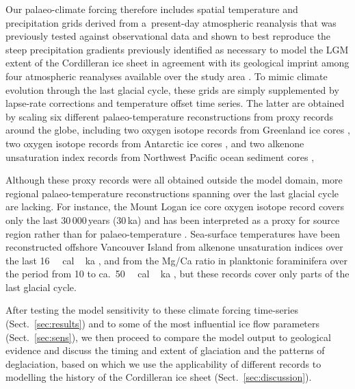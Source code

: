 \documentclass[tc, manuscript]{copernicus}
\begin{document}
      Our palaeo-climate forcing therefore includes spatial temperature and
      precipitation grids derived from a~present-day atmospheric reanalysis
      \citep{Mesinger.etal.2006} that was previously tested against
      observational data and shown to best reproduce the steep precipitation
      gradients previously identified as necessary to model the LGM extent
      of the Cordilleran ice sheet in agreement with its geological imprint
      among four atmospheric reanalyses available over the study area
      \citep{Seguinot.etal.2014}. To mimic climate evolution through the
      last glacial cycle, these grids are simply supplemented by lapse-rate
      corrections and temperature offset time series. The latter are
      obtained by scaling six different palaeo-temperature reconstructions
      from proxy records around the globe, including two oxygen isotope
      records from Greenland ice cores \citep{Dansgaard.etal.1993,
      Andersen.etal.2004}, two oxygen isotope records from Antarctic ice
      cores \citep{Petit.etal.1999,Jouzel.etal.2007}, and two alkenone
      unsaturation index records from Northwest Pacific ocean sediment cores
      \citep{Herbert.etal.2001},

      Although these proxy records were all obtained outside the model
      domain, more regional palaeo-temperature reconstructions spanning over
      the last glacial cycle are lacking. For instance, the Mount Logan ice
      core oxygen isotope record covers only the last 30\,000\,\unit{years}
      (30\,\unit{ka}) and has been interpreted as a proxy for source region
      rather than for palaeo-temperature \citep{Fisher.etal.2004,
      Fisher.etal.2008}. Sea-surface temperatures have been reconstructed
      offshore Vancouver Island from alkenone unsaturation indices over the
      last 16\,\unit{\,cal\,ka} \citep{Kienast.McKay.2001}, and
      from the Mg/Ca ratio in planktonic foraminifera over the period from
      10 to ca.~50\,\unit{\,cal\,ka} \citep{Taylor.etal.2014,
      Taylor.etal.2015}, but these records cover only parts of the last
      glacial cycle.

      After testing the model sensitivity to
      these climate forcing time-series (Sect.~\ref{sec:results}) and to
      some of the most influential ice flow parameters
      (Sect.~\ref{sec:sens}), we then proceed to compare the model output
      to geological evidence and discuss the timing and extent of glaciation
      and the patterns of deglaciation, based on which we use the
      applicability of different records to modelling the history of the
      Cordilleran ice sheet (Sect.~\ref{sec:discussion}).
\end{document}
